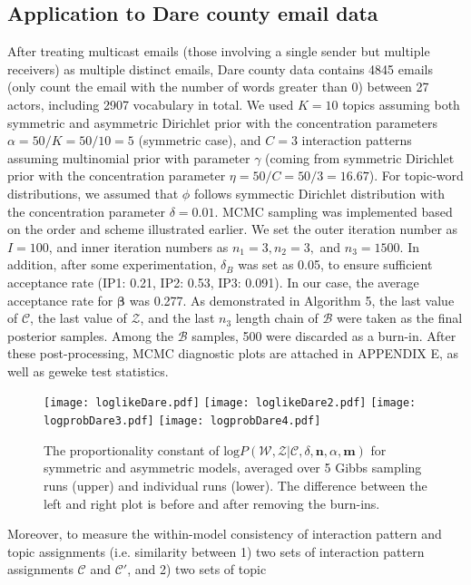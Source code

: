 \documentclass[a4paper]{article}
\begin{document}
\subsection{Application to Dare county email data}
After treating multicast emails (those involving a single sender but multiple receivers) as multiple distinct emails, Dare county data contains 4845 emails (only count the email with the number of words greater than 0) between 27 actors, including 2907 vocabulary in total. We used $K=10$ topics assuming both symmetric and asymmetric Dirichlet prior with the concentration parameters $\alpha=50/K=50/10=5$ (symmetric case), and $C=3$ interaction patterns assuming multinomial prior with parameter $\gamma$ (coming from symmetric Dirichlet prior with the concentration parameter $\eta = 50/C=50/3=16.67$). For topic-word distributions, we assumed that $\phi$ follows symmectic Dirichlet distribution with the concentration parameter $\delta=0.01$. MCMC sampling was implemented based on the order and scheme illustrated earlier. We set the outer iteration number as $I=100$, and inner iteration numbers as $n_1=3, n_2=3,$ and $n_3=1500$. In addition, after some experimentation, $\delta_B$ was set as 0.05, to ensure sufficient acceptance rate (IP1: 0.21, IP2: 0.53, IP3: 0.091). In our case, the average acceptance rate for $\boldsymbol{\beta}$ was 0.277. As demonstrated in Algorithm 5, the last value of $\mathcal{C}$, the last value of $\mathcal{Z}$, and the last $n_3$ length chain of $\mathcal{B}$ were taken as the final posterior samples. Among the $\mathcal{B}$ samples, 500 were discarded as a burn-in. After these post-processing, MCMC diagnostic plots are attached in APPENDIX E, as well as geweke test statistics.
\begin{figure}[ht]
	\centering
	\texttt{[image: loglikeDare.pdf]} 
	\texttt{[image: loglikeDare2.pdf]} 
		\texttt{[image: logprobDare3.pdf]} 
				\texttt{[image: logprobDare4.pdf]} 
	\caption{The proportionality constant of $\mbox{log}P(\mathcal{W},\mathcal{Z}|\mathcal{C}, \delta, \boldsymbol{n}, \alpha, \boldsymbol{m})$ for symmetric and asymmetric models, averaged over 5 Gibbs sampling runs (upper) and individual runs (lower). The difference between the left and right plot is before and after removing the burn-ins.}
	\label{fig:logPL1}
\end{figure}
\newline Moreover, to measure the within-model consistency of interaction pattern and topic assignments (i.e. similarity between 1) two sets of interaction pattern assignments $\mathcal{C}$ and $\mathcal{C'}$, and 2) two sets of topic
\end{document}
